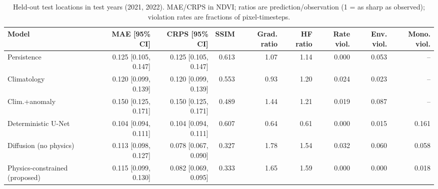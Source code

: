 \begin{table}[t]
\centering
\caption{Held-out test locations in test years (2021, 2022). MAE/CRPS in NDVI; ratios are prediction/observation (1 = as sharp as observed); violation rates are fractions of pixel-timesteps.}
\label{tab:main}
\scriptsize
\begin{tabular}{lrrrrrrrr}
\hline
Model & MAE [95\% CI] & CRPS [95\% CI] & SSIM & Grad. ratio & HF ratio & Rate viol. & Env. viol. & Mono. viol. \\
\hline
Persistence & 0.125 [0.105, 0.147] & 0.125 [0.105, 0.147] & 0.613 & 1.07 & 1.14 & 0.000 & 0.053 & -- \\
Climatology & 0.120 [0.099, 0.139] & 0.120 [0.099, 0.139] & 0.553 & 0.93 & 1.20 & 0.024 & 0.023 & -- \\
Clim.+anomaly & 0.150 [0.125, 0.171] & 0.150 [0.125, 0.171] & 0.489 & 1.44 & 1.21 & 0.019 & 0.087 & -- \\
Deterministic U-Net & 0.104 [0.094, 0.111] & 0.104 [0.094, 0.111] & 0.607 & 0.64 & 0.61 & 0.000 & 0.015 & 0.161 \\
Diffusion (no physics) & 0.113 [0.098, 0.127] & 0.078 [0.067, 0.090] & 0.327 & 1.78 & 1.54 & 0.032 & 0.060 & 0.058 \\
Physics-constrained (proposed) & 0.115 [0.099, 0.130] & 0.082 [0.069, 0.095] & 0.333 & 1.65 & 1.59 & 0.000 & 0.000 & 0.018 \\
\hline
\end{tabular}
\end{table}
